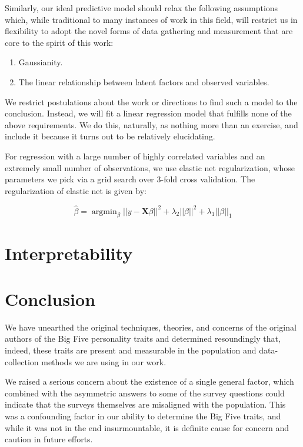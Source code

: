 \documentclass[a4paper,12pt]{article}
\DeclareMathOperator*{\argmin}{argmin}p
\begin{document}
Similarly, our ideal predictive model should relax the following assumptions which, while traditional to many instances of work in this field, will restrict us in flexibility to adopt the novel forms of data gathering and measurement that are core to the spirit of this work:

\begin{enumerate}
\item Gaussianity.
\item The linear relationship between latent factors and observed variables.
\end{enumerate}

We restrict postulations about the work or directions to find such a model to the conclusion. Instead, we will fit a linear regression model that fulfills none of the above requirements. We do this, naturally, as nothing more than an exercise, and include it because it turns out to be relatively elucidating.

For regression with a large number of highly correlated variables and an extremely small number of observations, we use elastic net regularization, whose parameters we pick via a grid search over 3-fold cross validation. The regularization of elastic net is given by:


$$
\hat{\beta} = \argmin_{\beta}||y - \mathbf{X}\beta ||^2 + \lambda_2|| \beta ||^2 + \lambda_1 || \beta ||_1
$$

\section{Interpretability}

\section{Conclusion}

We have unearthed the original techniques, theories, and concerns of the original authors of the Big Five personality traits and determined resoundingly that, indeed, these traits are present and measurable in the population and data-collection methods we are using in our work.

We raised a serious concern about the existence of a single general factor, which combined with the asymmetric answers to some of the survey questions could indicate that the surveys themselves are misaligned with the population. This was a confounding factor in our ability to determine the Big Five traits, and while it was not in the end insurmountable, it is definite cause for concern and caution in future efforts.
\end{document}
